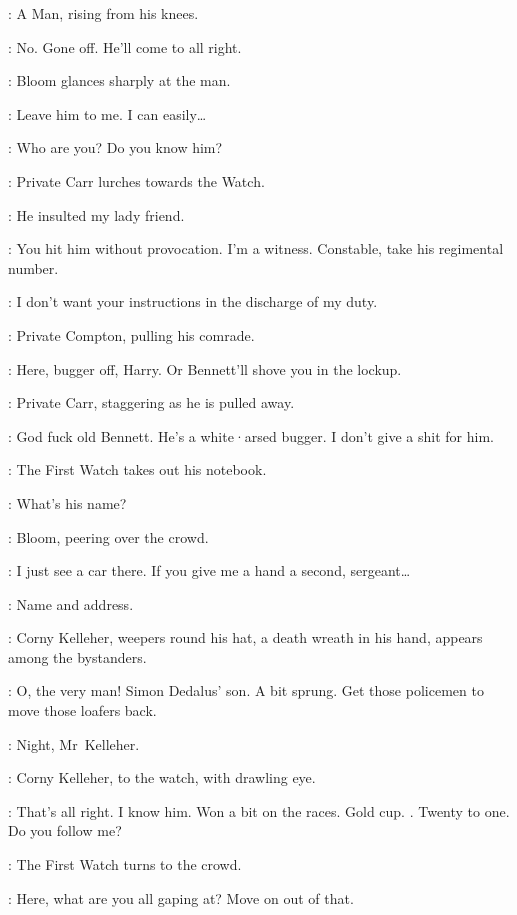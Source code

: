 :
A Man,
rising from his knees.

:
No.
Gone off.
He'll come to all right.

:
Bloom glances sharply at the man.

\Bloom:
Leave him to me.
I can easily…

\SecondWatch[2]:
Who are you?
Do you know him?

:
Private Carr lurches towards the Watch.

\Carr:
He insulted my lady friend.

\Bloom:
You hit him without provocation.
I'm a witness.
Constable,
take his regimental number.

\SecondWatch[2]:
I don't want your instructions in the discharge of my duty.

:
Private Compton,
pulling his comrade.

\Compton:
Here,
bugger off,
Harry.
Or Bennett'll shove you in the lockup.

:
Private Carr,
staggering as he is pulled away.

\Carr:
God fuck old Bennett.
He's a white·arsed bugger.
I don't give a shit for him.

:
The First Watch takes out his notebook.

\FirstWatch:
What's his name?

:
Bloom,
peering over the crowd.

\Bloom:
I just see a car there.
If you give me a hand a second,
sergeant…

\FirstWatch:
Name and address.

:
Corny Kelleher,
weepers round his hat,
a death wreath in his hand,
appears among the bystanders.

\Bloom:
O,
the very man!
Simon Dedalus' son.
A bit sprung.
Get those policemen to move those loafers back.

\SecondWatch[2]:
Night,
Mr~Kelleher.

:
Corny Kelleher,
to the watch,
with drawling eye.

\Corny:
That's all right.
I know him.
Won a bit on the races.
Gold cup.
.
Twenty to one.
Do you follow me?

:
The First Watch turns to the crowd.

\FirstWatch:
Here,
what are you all gaping at?
Move on out of that.

